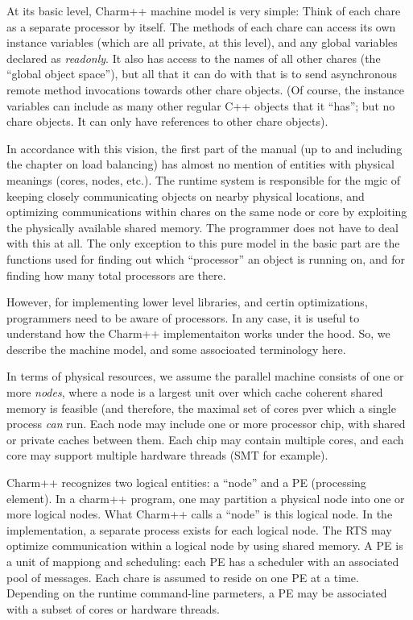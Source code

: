 
At its basic level, Charm++ machine model is very simple: Think of
each chare as a separate processor by itself. The methods of each
chare can access its own instance variables (which are all private, at
this level), and any global variables declared as {\em readonly}. It
also has access to the names of all other chares (the ``global object
space''), but all that it can do with that is to send asynchronous
remote method invocations towards other chare objects. (Of course, the
instance variables can include as many other regular C++ objects that
it ``has''; but no chare objects. It can only have references to other
chare objects).


In accordance with this vision, the first part of the manual (up to
and including the chapter on load balancing) has almost no mention of
entities with physical meanings (cores, nodes, etc.). The runtime
system is responsible for the mgic of keeping closely communicating
objects on nearby physical locations, and optimizing communications
within chares on the same node or core by exploiting the physically
available shared memory. The programmer does not have to deal with
this at all. The only exception to this pure model in the basic part
are the functions used for finding out which ``processor'' an object
is running on, and for finding how many total processors are there.

However, for implementing lower level libraries, and certin optimizations,
programmers need to be aware of processors. In any case, it is useful
to understand how the Charm++ implementaiton works under the hood. So,
we describe the machine model, and some associoated terminology here.

In terms of physical resources, we assume the parallel machine
consists of one or more {\em nodes}, where a node is a largest unit
over which cache coherent shared memory is feasible (and therefore,
the maximal set of cores pver which a single process {\em can} run.
Each node may include one or more processor chip, with shared or
private caches between them. Each chip may contain multiple cores, and
each core may support multiple hardware threads (SMT for example).

Charm++ recognizes two logical entities: a ``node'' and a PE
(processing element).  In a charm++ program, one may partition a
physical node into one or more logical nodes. What Charm++ calls a
``node'' is this logical node. In the implementation, a separate
process exists for each logical node. The RTS may optimize
communication within a logical node by using shared memory. A PE is a
unit of mappiong and scheduling: each PE has a scheduler with an
associated pool of messages. Each chare is assumed to reside on one PE
at a time. Depending on the runtime command-line parmeters, a PE may
be associated with a subset of cores or hardware threads. 

